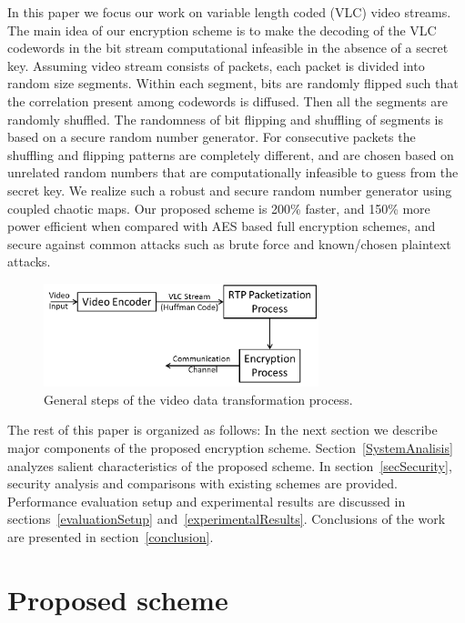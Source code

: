 \documentclass[preprint]{elsarticle}
\begin{document}
In this paper we focus our work on variable length coded (VLC) video streams. The main idea of our encryption scheme is to make the decoding of the VLC codewords in the bit stream computational infeasible in the absence of a secret key. Assuming video stream consists of packets, each packet is divided into random size segments. Within each segment, bits are randomly flipped such that the correlation present among codewords is diffused. Then all the segments are randomly shuffled. The randomness of bit flipping and shuffling of segments is based on a secure random number generator. For consecutive packets the shuffling and flipping patterns are completely different, and are chosen based on unrelated random numbers that are computationally infeasible to guess from the secret key. We realize such a robust and secure random number generator using coupled chaotic maps. Our proposed scheme is 200\% faster, and 150\% more power efficient when compared with AES based full encryption schemes, and secure against common attacks such as brute force and known/chosen plaintext attacks.

\begin{figure}[!ht]
\centering
\includegraphics[width=8cm]{figure1.png}
\caption{General steps of the video data transformation process.}
\label{f1}
\end{figure}

The rest of this paper is organized as follows: In the next section we describe major components of the proposed encryption scheme. Section~\ref{SystemAnalisis} analyzes salient characteristics of the proposed scheme. In section~\ref{secSecurity}, security analysis and comparisons with existing schemes are provided.  Performance evaluation setup and experimental results are discussed in sections~\ref{evaluationSetup} and~\ref{experimentalResults}. Conclusions of the work are presented in section~\ref{conclusion}.



\section{Proposed scheme}
\label{propScheme}
\end{document}
